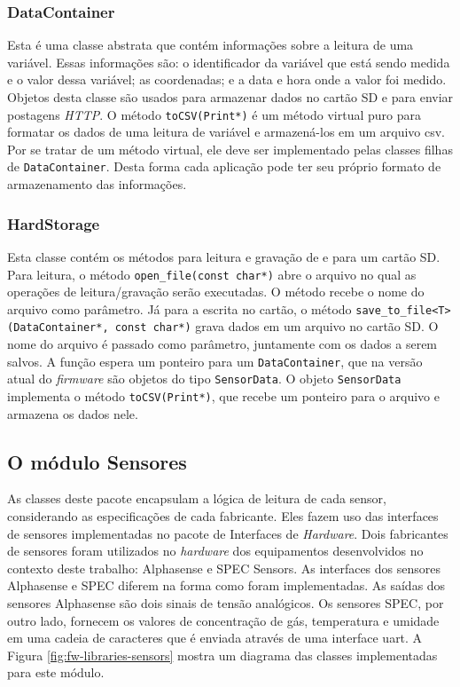 \subsubsection{DataContainer}
Esta é uma classe abstrata que contém informações sobre a leitura de uma variável. Essas informações são: o identificador da variável que está sendo medida e o valor dessa variável; as coordenadas; e a data e hora onde a valor foi medido. Objetos desta classe são usados para armazenar dados no cartão SD e para enviar postagens \textit{HTTP}. O método \texttt{toCSV(Print*)} é um método virtual puro para formatar os dados de uma leitura de variável e armazená-los em um arquivo \acrshort{csv}. Por se tratar de um método virtual, ele deve ser implementado pelas classes filhas de \texttt{DataContainer}. Desta forma cada aplicação pode ter seu próprio formato de armazenamento das informações.

\subsubsection{HardStorage}
Esta classe contém os métodos para leitura e gravação de e para um cartão SD. Para leitura, o método \texttt{open\_file(const char*)} abre o arquivo no qual as operações de leitura/gravação serão executadas. O método recebe o nome do arquivo como parâmetro. Já para a escrita no cartão, o método \texttt{save\_to\_file<T>(DataContainer*, const char*)} grava dados em um arquivo no cartão SD. O nome do arquivo é passado como parâmetro, juntamente com os dados a serem salvos. A função espera um ponteiro para um \texttt{DataContainer}, que na versão atual do \textit{firmware} são objetos do tipo \texttt{SensorData}. O objeto \texttt{SensorData} implementa o método \texttt{toCSV(Print*)}, que recebe um ponteiro para o arquivo e armazena os dados nele.

\subsection{O módulo Sensores}

As classes deste pacote encapsulam a lógica de leitura de cada sensor, considerando as especificações de cada fabricante. Eles fazem uso das interfaces de sensores implementadas no pacote de Interfaces de \textit{Hardware}. Dois fabricantes de sensores foram utilizados no \textit{hardware} dos equipamentos desenvolvidos no contexto deste trabalho: Alphasense e SPEC Sensors. As interfaces dos sensores Alphasense e SPEC diferem na forma como foram implementadas. As saídas dos sensores Alphasense são dois sinais de tensão analógicos. Os sensores SPEC, por outro lado, fornecem os valores de concentração de gás, temperatura e umidade em uma cadeia de caracteres que é enviada através de uma interface \acrshort{uart}. A Figura \ref{fig:fw-libraries-sensors} mostra um diagrama das classes implementadas para este módulo.

